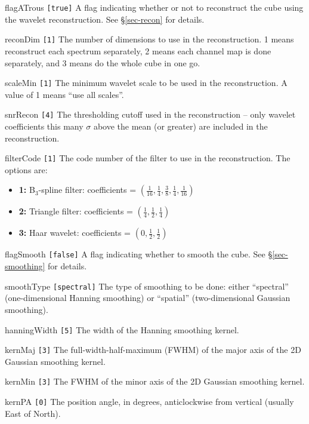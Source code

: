 \begin{entry}
\item [flagATrous \texttt{[true]}] A flag indicating whether or not to
  reconstruct the cube using the \atrous wavelet
  reconstruction. See \S\ref{sec-recon} for details.
\item[reconDim \texttt{[1]}] The number of dimensions to use in the
  reconstruction. 1 means reconstruct each spectrum separately, 2
  means each channel map is done separately, and 3 means do the whole
  cube in one go.
\item[scaleMin \texttt{[1]}] The minimum wavelet scale to be used in the
  reconstruction. A value of 1 means ``use all scales''.
\item[snrRecon \texttt{[4]}] The thresholding cutoff used in the
  reconstruction -- only wavelet coefficients this many $\sigma$ above
  the mean (or greater) are included in the reconstruction. 
\item[filterCode \texttt{[1]}] The code number of the filter to use in
  the reconstruction. The options are:
  \begin{itemize}
  \item \textbf{1:} B$_3$-spline filter: coefficients = 
    $(\frac{1}{16}, \frac{1}{4}, \frac{3}{8}, \frac{1}{4}, \frac{1}{16})$
  \item \textbf{2:} Triangle filter: coefficients = 
    $(\frac{1}{4}, \frac{1}{2}, \frac{1}{4})$
  \item \textbf{3:} Haar wavelet: coefficients = 
    $(0, \frac{1}{2}, \frac{1}{2})$
  \end{itemize}
\end{entry}

\begin{entry}
\item [flagSmooth \texttt{[false]}] A flag indicating whether to
  smooth the cube. See \S\ref{sec-smoothing} for details. 
\item [smoothType \texttt{[spectral]}] The type of smoothing to be
done: either ``spectral'' (one-dimensional Hanning smoothing) or
``spatial'' (two-dimensional Gaussian smoothing). 
\item [hanningWidth \texttt{[5]}] The width of the Hanning smoothing
kernel. 
\item [kernMaj \texttt{[3]}] The full-width-half-maximum (FWHM) of the
major axis of the 2D Gaussian smoothing kernel.
\item [kernMin \texttt{[3]}] The FWHM of the minor axis of the 2D
Gaussian smoothing kernel.
\item [kernPA \texttt{[0]}] The position angle, in degrees,
anticlockwise from vertical (\ie usually East of North). 
\end{entry}


